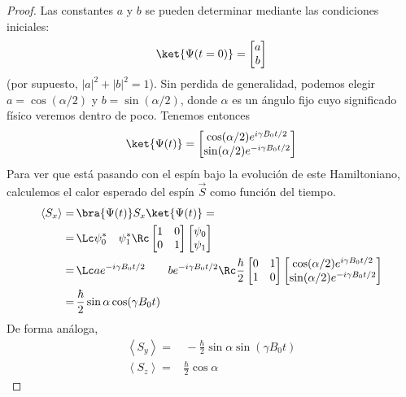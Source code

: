 \begin{proof}
Las constantes $a$ y $b$ se pueden determinar mediante las condiciones iniciales:
	\begin{equation}
	\ket{\Psi (t = 0)} = \begin{bmatrix} a \\ b	\end{bmatrix}
	\end{equation}
(por supuesto, $|a|^2 + |b|^2 = 1$). Sin perdida de generalidad, podemos elegir $a = \cos (\alpha/2)$ y $b = \sin (\alpha/2)$, donde $\alpha$ es un ángulo fijo cuyo significado físico veremos dentro de poco.
Tenemos entonces
	\begin{equation}
	\ket{\Psi (t)} = 
	\begin{bmatrix} 
	\cos (\alpha/2) e^{i \gamma B_0 t/2} \\ 
	\sin (\alpha/2) e^{-i \gamma B_0 t/2} 
	\end{bmatrix}
	\end{equation}
Para ver que está pasando con el espín bajo la evolución de este Hamiltoniano, calculemos el calor esperado del espín $\vec{S}$ como función del tiempo.
	\begin{equation} 
\begin{aligned}
	\left\langle S_x \right\rangle = & \, \bra{\Psi(t)} S_x \ket{\Psi(t)} = 
	\nonumber \\
	= & \, \Lc \psi_0^* \quad \psi_1^* \Rc 
	\begin{bmatrix} 1 & 0 \\ 0 & 1 \end{bmatrix}  
	\begin{bmatrix} \psi_0 \\ \psi_1 \end{bmatrix} 
	\nonumber \\
	= & \, \Lc a e ^{-i \gamma B_0 t/2} \qquad  b e ^{-i \gamma B_0 t/2} \Rc 
	\frac{\hbar}{2} \begin{bmatrix} 0 & 1 \\ 1 & 0 \end{bmatrix} 
	\begin{bmatrix} \cos (\alpha/2) e^{i \gamma B_0 t/2} \\ \sin (\alpha/2) e^{-i \gamma B_0 t/2} \end{bmatrix} 
	\nonumber \\
	= & \, \frac{\hbar}{2} \sin \alpha \cos (\gamma B_0 t ) 
	\end{aligned}
\end{equation}
De forma análoga,
	\begin{equation} 
\begin{aligned}
	\left\langle S_y \right\rangle = & \, - \frac{\hbar}{2} \sin \alpha \sin (\gamma B_0 t )  \\
	\left\langle S_z \right\rangle = & \frac{\hbar}{2} \cos \alpha
	\end{aligned}
\end{equation}


\end{proof}
